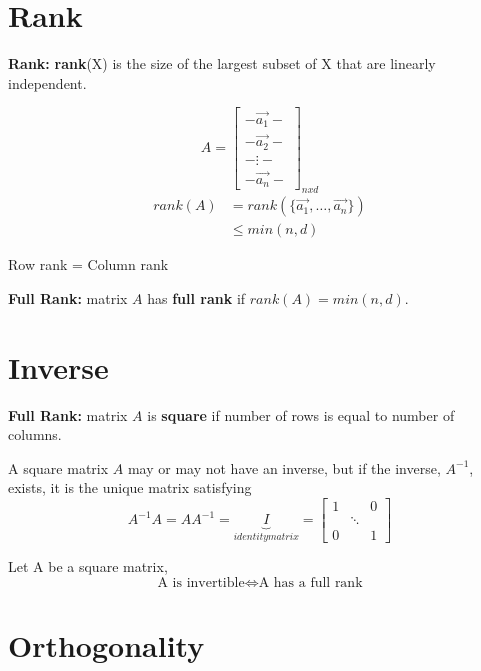 \documentclass[12pt]{article}
\begin{document}
\section{Rank}
\theoremstyle{definition}
\begin{definition}{\textbf{Rank: }}
\textbf{rank}(X) is the size of the largest subset of X that are linearly independent.
\end{definition}
$$ A = \begin{bmatrix}- \vec{a_1}- \\ -\vec{a_2}- \\ -\vdots -\\ -\vec{a_n}- \end{bmatrix}_{nxd}$$
\begin{align*}
    rank(A) &= rank(\{ \vec{a_1}, \dots, \vec{a_n} \}) \\
            &\leq min (n, d)
\end{align*}
\begin{fact}
Row rank = Column rank
\end{fact}
\begin{definition}{\textbf{Full Rank: }}
matrix $A$ has \textbf{full rank} if $rank(A) = min(n,d)$.
\end{definition}

\section{Inverse}
\begin{definition}{\textbf{Full Rank: }}
matrix $A$ is \textbf{square} if number of rows is equal to number of columns.
\end{definition}

A square matrix $A$ may or may not have an inverse, but if the inverse, $A^{-1}$, exists, it is the unique matrix satisfying 
$$A^{-1}A = AA^{-1} = \underbrace{I}_{identity matrix} = \begin{bmatrix} 
                    1 &  & 0 \\
                     & \ddots & \\
                    0 &  & 1 
                    \end{bmatrix}$$

\begin{theorem}
Let A be a square matrix,
$$\text{A is invertible} \Longleftrightarrow \text{A has a full rank} $$
\end{theorem}

\section{Orthogonality}
\end{document}
